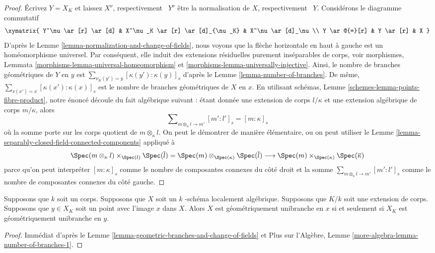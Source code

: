 \begin{proof}
Écrivez $Y = X_K$ et laissez $X^\nu$, respectivement \ $Y^\nu$ être la
normalisation de $X$, respectivement \ $Y$. Considérons le diagramme commutatif
$$
\xymatrix{
Y^\nu \ar[r] \ar[d] & X^\nu_K \ar[r] \ar[d]_{\nu_K} & X^\nu \ar[d]_\nu \\
Y \ar@{=}[r] & Y \ar[r] & X
}
$$
D'après le Lemme
\ref{lemma-normalization-and-change-of-fields}, nous voyons que
la flèche horizontale en haut à gauche est un homéomorphisme
universel. Par conséquent, elle induit des extensions
résiduelles purement inséparables de corps, voir morphismes,
Lemmata \ref{morphisms-lemma-universal-homeomorphism} et
\ref{morphisms-lemma-universally-injective}. Ainsi, le nombre de
branches géométriques de $Y$ en $y$ est $\sum_{\nu_K(y') = y}
[\kappa(y') : \kappa(y)]_s$ d'après le Lemme
\ref{lemma-number-of-branches}. De même, $\sum_{\nu(x') = x} [\kappa(x')
: \kappa(x)]_s$ est le nombre de branches géométriques de $X$ en $x$. En
utilisant schémas, Lemme \ref{schemes-lemma-points-fibre-product}, notre
énoncé découle du fait algébrique suivant : étant donnée une extension de
corps $l/\kappa$ et une extension algébrique de corps $m/\kappa$, alors
$$
\sum\nolimits_{m \otimes_\kappa l \to m'} [m' : l']_s = [m : \kappa]_s
$$
où la somme porte sur les corps quotient de $m
\otimes_\kappa l$. On peut le démontrer de manière
élémentaire, ou on peut utiliser le Lemme
\ref{lemma-separably-closed-field-connected-components} appliqué à
$$
\Spec(m \otimes_\kappa l) \times_{\Spec(l)} \Spec(\overline{l}) =
\Spec(m) \otimes_{\Spec(\kappa)} \Spec(\overline{l})
\longrightarrow
\Spec(m) \times_{\Spec(\kappa)} \Spec(\overline{\kappa})
$$
parce qu'on peut interpréter $[m : \kappa]_s$ comme
le nombre de composantes connexes du côté droit et la
somme $\sum_{m \otimes_\kappa l \to m'} [m' : l']_s$
comme le nombre de composantes connexes du côté gauche.
\end{proof}

\begin{lemma}
\label{lemma-geometrically-unibranch-and-change-of-fields}
Supposons que $k$ soit un corps. Supposons que $X$ soit un $k$ -schéma
localement algébrique. Supposons que $K/k$ soit une extension de corps. Supposons
que $y \in X_K$ soit un point avec l'image $x$ dans $X$. Alors $X$ est
géométriquement unibranche en $x$ si et seulement si $X_K$ est géométriquement unibranche en $y$.
\end{lemma}

\begin{proof}
Immédiat d'après le Lemme
\ref{lemma-geometric-branches-and-change-of-fields} et Plus sur
l'Algèbre, Lemme \ref{more-algebra-lemma-number-of-branches-1}.
\end{proof}

